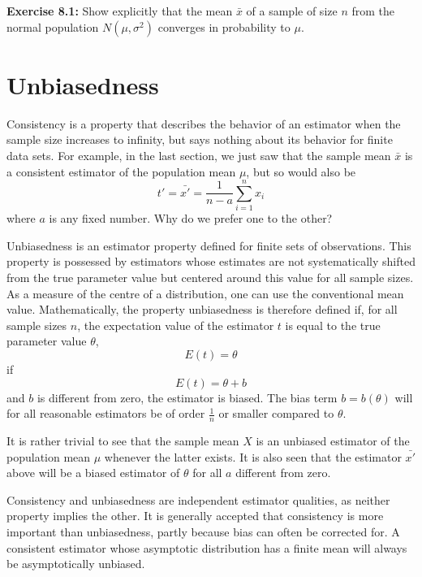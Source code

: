 \documentclass[../main.tex]{subfiles}
\begin{document}
\textbf{Exercise 8.1:}
Show explicitly that
the mean $\bar{x}$ of a sample of size $n$
from the normal population $N(\mu,\sigma^2)$
converges in probability to $\mu$.

\section{Unbiasedness}

Consistency is a property
that describes the behavior of an estimator when the sample size increases to infinity,
but says nothing about its behavior for finite data sets.
For example,
in the last section,
we just saw that the sample mean $\bar{x}$ is a consistent estimator of the population mean $\mu$,
but so would also be
%
\begin{equation}
    t' = \bar{x'} = \frac{1}{n-a} \sum_{i=1}^n x_i
\end{equation}
%
where $a$ is any fixed number.
Why do we prefer one to the other?

Unbiasedness is an estimator property defined for finite sets of observations.
This property is possessed by estimators whose estimates are not systematically shifted from the true parameter value
but centered around this value for all sample sizes.
As a measure of the centre of a distribution,
one can use the conventional mean value.
Mathematically, the property unbiasedness is therefore defined if,
for all sample sizes $n$,
the expectation value of the estimator $t$ is equal to the true parameter value $\theta$,
%
\begin{equation}
    E(t) = \theta
    \label{eq:8.3}
\end{equation}
%
if
%
\begin{equation}
    E(t) = \theta + b
    \label{eq:8.4}
\end{equation}
%
and $b$ is different from zero, the estimator is biased.
The bias term $b = b(\theta)$
will for all reasonable estimators be of order $\frac{1}{n}$ or smaller compared to $\theta$.

It is rather trivial to see that the sample mean $X$ is an unbiased
estimator of the population mean $\mu$ whenever the latter exists.
It is also seen that the estimator $\bar{x'}$ above
will be a biased estimator of $\theta$ for all $a$ different from zero.

Consistency and unbiasedness are independent estimator qualities,
as neither property implies the other.
It is generally accepted that consistency is more important than unbiasedness,
partly because bias can often be corrected for.
A consistent estimator whose asymptotic distribution has a finite mean will always be asymptotically unbiased.
\end{document}

